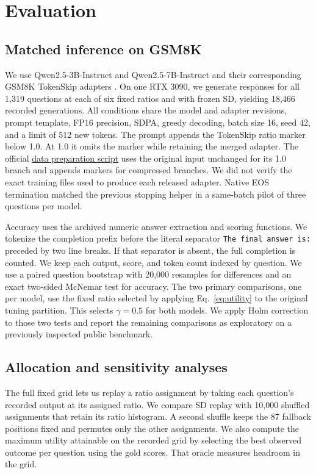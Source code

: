 \documentclass[a4paper,runningheads]{llncs}
\begin{document}
\section{Evaluation}
\subsection{Matched inference on GSM8K}
We use Qwen2.5-3B-Instruct and Qwen2.5-7B-Instruct \cite{qwen25} and their corresponding GSM8K TokenSkip adapters \cite{tokenskip}. On one RTX 3090, we generate responses for all 1,319 questions at each of six fixed ratios and with frozen SD, yielding 18,466 recorded generations. All conditions share the model and adapter revisions, prompt template, FP16 precision, SDPA, greedy decoding, batch size 16, seed 42, and a limit of 512 new tokens. The prompt appends the TokenSkip ratio marker below 1.0. At 1.0 it omits the marker while retaining the merged adapter. The official \href{https://github.com/hemingkx/TokenSkip/blob/main/get_llamafactory_input.py}{data preparation script} uses the original input unchanged for its 1.0 branch and appends markers for compressed branches. We did not verify the exact training files used to produce each released adapter. Native EOS termination matched the previous stopping helper in a same-batch pilot of three questions per model.

Accuracy uses the archived numeric answer extraction and scoring functions. We tokenize the completion prefix before the literal separator \texttt{The final answer is:} preceded by two line breaks. If that separator is absent, the full completion is counted. We keep each output, score, and token count indexed by question. We use a paired question bootstrap with 20,000 resamples for differences and an exact two-sided McNemar test for accuracy. The two primary comparisons, one per model, use the fixed ratio selected by applying Eq.~\ref{eq:utility} to the original tuning partition. This selects $\gamma=0.5$ for both models. We apply Holm correction to those two tests and report the remaining comparisons as exploratory on a previously inspected public benchmark.

\subsection{Allocation and sensitivity analyses}
The full fixed grid lets us replay a ratio assignment by taking each question's recorded output at its assigned ratio. We compare SD replay with 10,000 shuffled assignments that retain its ratio histogram. A second shuffle keeps the 87 fallback positions fixed and permutes only the other assignments. We also compute the maximum utility attainable on the recorded grid by selecting the best observed outcome per question using the gold scores. That oracle measures headroom in the grid.
\end{document}
